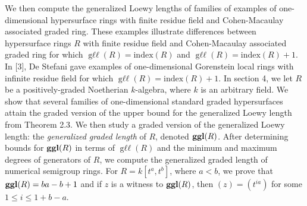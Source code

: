 \documentclass{amsart}
\theoremstyle{definition}
\theoremstyle{definition}
\DeclareMathOperator{\gll}{\text{g}\ell\ell}
\DeclareMathOperator{\ggl}{\bf{ggl}}
\numberwithin{equation}{section}
\theoremstyle{definition}
\begin{document}
{We then compute the generalized Loewy lengths of families of examples of one-dimensional hypersurface rings with finite residue field and Cohen-Macaulay associated graded ring. These examples illustrate differences between hypersurface rings $R$ with finite residue field and Cohen-Macaulay associated graded ring for which $\gll(R)=\text{index}(R)$ and $\gll(R)=\text{index}(R)+1$. In [3], De Stefani gave examples of one-dimensional Gorenstein local rings with infinite residue field for which $\gll(R)=\text{index}(R)+1$.
\newline\newline  
In section 4, we let $R$ be a positively-graded Noetherian $k$-algebra, where $k$ is an arbitrary field. We show that several families of one-dimensional standard graded hypersurfaces attain the graded version of the upper bound for the generalized Loewy length from Theorem 2.3. We then study a graded version of the generalized Loewy length: the {\it{generalized graded length}} of $R$, denoted $\ggl(R)$. After determining bounds for $\ggl(R)$ in terms of $\gll(R)$ and the minimum and maximum degrees of generators of $R$, we compute the generalized graded length of numerical semigroup rings. For $R=k[t^a,t^b]$, where $a<b$, we prove that $\ggl(R)=ba-b+1$ and if $z$ is a witness to $\ggl(R)$, then $(z)=(t^{ia})$ for some $1 \leq i \leq 1+b-a$.\newline\newline 
}
\end{document}
